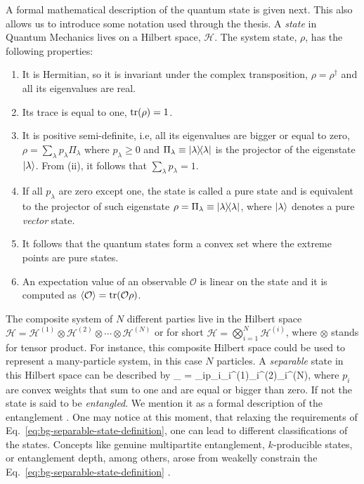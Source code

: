 A formal mathematical description of the quantum state is given next.
This also allows us to introduce some notation used through the thesis.
A \emph{state} in Quantum Mechanics lives on a Hilbert space, $\mathcal{H}$.
The system state, $\rho$, has the following properties:
\begin{enumerate}
  \item
  It is Hermitian, so it is invariant under the complex transposition, $\rho=\rho^\dagger$ and all its eigenvalues are real.
  \item Its trace is equal to one, $\operatorname{tr}(\rho)=1$.
  \item It is positive semi-definite, i.e, all its eigenvalues are bigger or equal to zero, $\rho=\sum_{\lambda}p_\lambda \Pi_\lambda$ where $p_\lambda\geq 0$ and $\Pi_\lambda\equiv\vert \lambda \rangle \! \langle \lambda \vert$ is the projector of the eigenstate $\vert \lambda \rangle$.
  From (ii), it follows that $\sum_\lambda p_\lambda = 1$.
  \item If all $p_\lambda$ are zero except one, the state is called a pure state and is equivalent to the projector of such eigenstate $\rho=\Pi_\lambda\equiv\vert \lambda \rangle \! \langle \lambda \vert$, where $\vert \lambda \rangle$ denotes a pure \emph{vector} state.
  \item It follows that the quantum states form a convex set where the extreme points are pure states.
  \item An expectation value of an observable $\mathcal{O}$ is linear on the state and it is computed as $\langle \mathcal{O} \rangle=\operatorname{tr}(\mathcal{O}\rho)$.
\end{enumerate}

The composite system of $N$ different parties live in the Hilbert space $\mathcal{H} = \mathcal{H}^{(1)}\otimes\mathcal{H}^{(2)}\otimes\cdots\otimes\mathcal{H}^{(N)}$ or for short $\mathcal{H} = \bigotimes_{i=1}^N\mathcal{H}^{(i)}$, where $\otimes$ stands for tensor product.
For instance, this composite Hilbert space could be used to represent a many-particle system, in this case $N$ particles.
A \emph{separable} state in this Hilbert space can be described by
\be
  \label{eq:bg-separable-state-definition}
  \rho_{} = \sum_{i}p_i\rho_i^{(1)}\otimes\rho_i^{(2)}\otimes\cdots\otimes\rho_i^{(N)},
\ee
where $p_i$ are convex weights that sum to one and are equal or bigger than zero.
If not the state is said to be \emph{entangled}.
We mention it as a formal description of the entanglement \citep{}.
One may notice at this moment, that relaxing the requirements of Eq.~\eqref{eq:bg-separable-state-definition}, one can lead to different classifications of the states.
Concepts like genuine multipartite entanglement, $k$-producible states, or entanglement depth, among others, arose from weakelly constrain the Eq.~\eqref{eq:bg-separable-state-definition} \citep{}.

